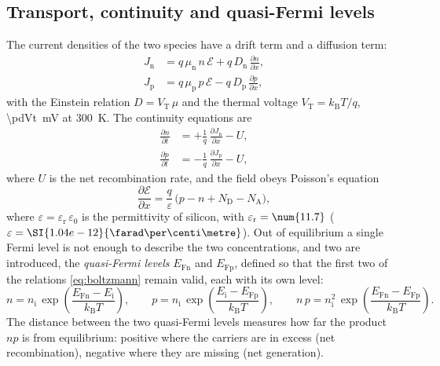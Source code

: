 \documentclass[10pt,a4paper]{scrartcl}
\newcommand{\VT}{V_\mathrm{T}}
\newcommand{\Ef}{\mathcal{E}}                 %
\newcommand{\ND}{N_\mathrm{D}}
\newcommand{\NA}{N_\mathrm{A}}
\newcommand{\nint}{n_\mathrm{i}}
\newcommand{\Dn}{D_\mathrm{n}}
\newcommand{\Dp}{D_\mathrm{p}}
\newcommand{\mun}{\mu_\mathrm{n}}
\newcommand{\mup}{\mu_\mathrm{p}}
\newcommand{\Jn}{J_\mathrm{n}}
\newcommand{\Jp}{J_\mathrm{p}}
\newcommand{\kB}{k_\mathrm{B}}
\newcommand{\EFn}{E_\mathrm{Fn}}
\newcommand{\EFp}{E_\mathrm{Fp}}
\newcommand{\dpar}[2]{\frac{\partial #1}{\partial #2}}
\begin{document}
\subsection{Transport, continuity and quasi-Fermi levels}
\label{sec:transport}
The current densities of the two species have a drift term and a diffusion term:
\begin{align}
\Jn &= q\,\mun\,n\,\Ef + q\,\Dn\,\dpar{n}{x} , \label{eq:jn}\\
\Jp &= q\,\mup\,p\,\Ef - q\,\Dp\,\dpar{p}{x} , \label{eq:jp}
\end{align}
with the Einstein relation $D = \VT\,\mu$ and the thermal voltage $\VT = \kB T/q$, \SI{\pdVt}{\milli\volt} at \SI{300}{\kelvin}. The continuity equations are
\begin{align}
\dpar{n}{t} &= +\frac{1}{q}\,\dpar{\Jn}{x} - U , \label{eq:contn}\\
\dpar{p}{t} &= -\frac{1}{q}\,\dpar{\Jp}{x} - U , \label{eq:contp}
\end{align}
where $U$ is the net recombination rate, and the field obeys Poisson's equation
\begin{equation}
\dpar{\Ef}{x} = \frac{q}{\varepsilon}\,\bigl(p - n + \ND - \NA\bigr) ,
\label{eq:poisson}
\end{equation}
where $\varepsilon = \varepsilon_\mathrm{r}\,\varepsilon_0$ is the permittivity of silicon, with $\varepsilon_\mathrm{r} = \num{\pdEpsR}$ ($\varepsilon = \SI{\pdEpsFcm e-12}{\farad\per\centi\metre}$). Out of equilibrium a single Fermi level is not enough to describe the two concentrations, and two are introduced, the \emph{quasi-Fermi levels} $\EFn$ and $\EFp$, defined so that the first two of the relations \eqref{eq:boltzmann} remain valid, each with its own level:
\begin{equation}
n = \nint\,\exp\!\left(\frac{\EFn - E_\mathrm{i}}{\kB T}\right) , \qquad
p = \nint\,\exp\!\left(\frac{E_\mathrm{i} - \EFp}{\kB T}\right) , \qquad
n\,p = \nint^2\,\exp\!\left(\frac{\EFn - \EFp}{\kB T}\right) .
\label{eq:qfl}
\end{equation}
The distance between the two quasi-Fermi levels measures how far the product $np$ is from equilibrium: positive where the carriers are in excess (net recombination), negative where they are missing (net generation).
\end{document}
